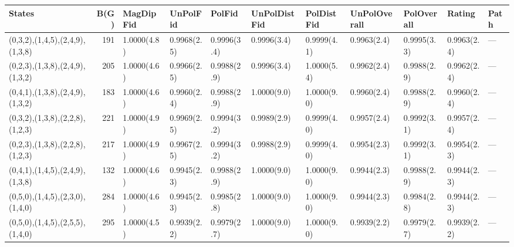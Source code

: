 \begin{tabular}{lrlllllllll}
\hline
 States                          &   B(G) & MagDipFid   & UnPolFid    & PolFid      & UnPolDistFid   & PolDistFid   & UnPolOverall   & PolOverall   & Rating      & Path   \\
\hline
 (0,3,2),(1,4,5),(2,4,9),(1,3,8) &    191 & 1.0000(4.8) & 0.9968(2.5) & 0.9996(3.4) & 0.9996(3.4)    & 0.9999(4.1)  & 0.9963(2.4)    & 0.9995(3.3)  & 0.9963(2.4) & ---    \\
 (0,2,3),(1,3,8),(2,4,9),(1,3,2) &    205 & 1.0000(4.6) & 0.9966(2.5) & 0.9988(2.9) & 0.9996(3.4)    & 1.0000(5.4)  & 0.9962(2.4)    & 0.9988(2.9)  & 0.9962(2.4) & ---    \\
 (0,4,1),(1,3,8),(2,4,9),(1,3,2) &    183 & 1.0000(4.6) & 0.9960(2.4) & 0.9988(2.9) & 1.0000(9.0)    & 1.0000(9.0)  & 0.9960(2.4)    & 0.9988(2.9)  & 0.9960(2.4) & ---    \\
 (0,3,2),(1,3,8),(2,2,8),(1,2,3) &    221 & 1.0000(4.9) & 0.9969(2.5) & 0.9994(3.2) & 0.9989(2.9)    & 0.9999(4.0)  & 0.9957(2.4)    & 0.9992(3.1)  & 0.9957(2.4) & ---    \\
 (0,2,3),(1,3,8),(2,2,8),(1,2,3) &    217 & 1.0000(4.9) & 0.9967(2.5) & 0.9994(3.2) & 0.9988(2.9)    & 0.9999(4.0)  & 0.9954(2.3)    & 0.9992(3.1)  & 0.9954(2.3) & ---    \\
 (0,4,1),(1,4,5),(2,4,9),(1,3,8) &    132 & 1.0000(4.6) & 0.9945(2.3) & 0.9988(2.9) & 1.0000(9.0)    & 1.0000(9.0)  & 0.9944(2.3)    & 0.9988(2.9)  & 0.9944(2.3) & ---    \\
 (0,5,0),(1,4,5),(2,3,0),(1,4,0) &    284 & 1.0000(4.6) & 0.9945(2.3) & 0.9985(2.8) & 1.0000(9.0)    & 1.0000(9.0)  & 0.9944(2.3)    & 0.9984(2.8)  & 0.9944(2.3) & ---    \\
 (0,5,0),(1,4,5),(2,5,5),(1,4,0) &    295 & 1.0000(4.5) & 0.9939(2.2) & 0.9979(2.7) & 1.0000(9.0)    & 1.0000(9.0)  & 0.9939(2.2)    & 0.9979(2.7)  & 0.9939(2.2) & ---    \\
\hline
\end{tabular}